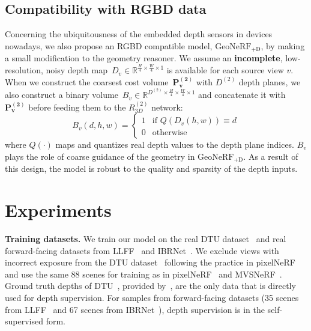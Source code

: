 \subsection{Compatibility with RGBD data} \label{sec:c3_rgbd_method}
Concerning the ubiquitousness of the embedded depth sensors in devices nowadays, we also propose an RGBD compatible model, $\text{GeoNeRF}_{\text{+D}}$, by making a small modification to the geometry reasoner. We assume an \textbf{incomplete}, low-resolution, noisy depth map~$D_{v} \in \mathbb{R}^{\frac{H}{4} \times \frac{W}{4} \times 1}$ is available for each source view $v$. When we construct the coarsest cost volume~$\boldsymbol{P^{(2)}_{v}}$ with $D^{(2)}$ depth planes, we also construct a binary volume~$B_{v} \in \mathbb{R}^{D^{(2)} \times \frac{H}{4} \times \frac{W}{4} \times 1}$ and concatenate it with $\boldsymbol{P^{(2)}_{v}}$ before feeding them to the $R^{(2)}_{3D}$ network:
\begin{equation}
    B_{v}(d,h,w) = \begin{cases} 
    1 &\mbox{if } Q \left( D_{v} \left(h,w \right) \right) \equiv d \\
    0 & \mbox{otherwise} 
    \end{cases}
\end{equation}
where $Q(\cdot)$ maps and quantizes real depth values to the depth plane indices. $B_{v}$ plays the role of coarse guidance of the geometry in $\text{GeoNeRF}_{\text{+D}}$. As a result of this design, the model is robust to the quality and sparsity of the depth inputs.

\section{Experiments} \label{sec:c3_experiments}
\noindent\textbf{Training datasets.} We train our model on the real DTU dataset~\citep{jensen2014large} and real forward-facing datasets from LLFF~\citep{mildenhall2019llff} and IBRNet~\citep{wang2021ibrnet}. We exclude views with incorrect exposure from the DTU dataset~\citep{jensen2014large} following the practice in pixelNeRF~\citep{yu2021pixelnerf} and use the same 88 scenes for training as in pixelNeRF~\citep{yu2021pixelnerf} and MVSNeRF~\citep{chen2021mvsnerf}. Ground truth depths of DTU~\citep{jensen2014large}, provided by~\cite{yao2018mvsnet}, are the only data that is directly used for depth supervision. For samples from forward-facing datasets (35 scenes from LLFF~\citep{mildenhall2019llff} and 67 scenes from IBRNet~\citep{wang2021ibrnet}), depth supervision is in the self-supervised form. \\

